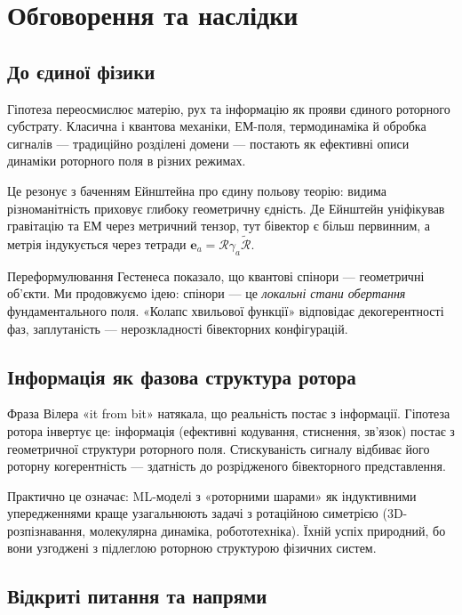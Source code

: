 \documentclass[11pt,a4paper]{article}
\newcommand{\rev}[1]{\widetilde{#1}}           %
\newcommand{\Rotor}{\mathcal{R}}
\theoremstyle{definition}
\theoremstyle{plain}
\theoremstyle{remark}
\begin{document}
\vspace{1em}

\section{Обговорення та наслідки}\label{sec:discussion}

\subsection{До єдиної фізики}

Гіпотеза переосмислює матерію, рух та інформацію як прояви єдиного роторного субстрату. Класична і квантова механіки, ЕМ-поля, термодинаміка й обробка сигналів — традиційно розділені домени — постають як ефективні описи динаміки роторного поля в різних режимах.

Це резонує з баченням Ейнштейна про єдину польову теорію: видима різноманітність приховує глибоку геометричну єдність. Де Ейнштейн уніфікував гравітацію та ЕМ через метричний тензор, тут бівектор є більш первинним, а метрія індукується через тетради $\mathbf{e}_a = \Rotor \gamma_a \rev{\Rotor}$.

Переформулювання Гестенеса показало, що квантові спінори — геометричні об’єкти. Ми продовжуємо ідею: спінори — це \emph{локальні стани обертання} фундаментального поля. «Колапс хвильової функції» відповідає декогерентності фаз, заплутаність — нерозкладності бівекторних конфігурацій.

\subsection{Інформація як фазова структура ротора}

Фраза Вілера «it from bit» натякала, що реальність постає з інформації. Гіпотеза ротора інвертує це: інформація (ефективні кодування, стиснення, зв’язок) постає з геометричної структури роторного поля. Стискуваність сигналу відбиває його роторну когерентність — здатність до розрідженого бівекторного представлення.

Практично це означає: ML-моделі з «роторними шарами» як індуктивними упередженнями краще узагальнюють задачі з ротаційною симетрією (3D-розпізнавання, молекулярна динаміка, робототехніка). Їхній успіх природний, бо вони узгоджені з підлеглою роторною структурою фізичних систем.

\subsection{Відкриті питання та напрями}
\end{document}
